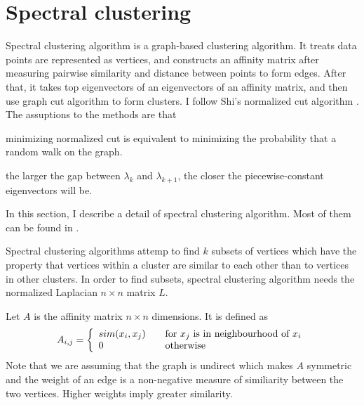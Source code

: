 \section{Spectral clustering}
Spectral clustering algorithm is a graph-based clustering algorithm. 
It treats data points are represented as vertices, and constructs an affinity matrix after measuring pairwise similarity and distance between points to form edges. 
After that, it takes top eigenvectors of an eigenvectors of an affinity matrix, and then use graph cut algorithm to form clusters. 
I follow Shi's normalized cut algorithm \cite{jianbo03}. 
The assuptions to the methods are that \begin{inparaenum}[\itshape a\upshape)]
\item minimizing normalized cut is equivalent to minimizing the probability that a random walk on the graph.
\item the larger the gap between $\lambda_{k}$ and $\lambda_{k+1}$, the closer the piecewise-constant eigenvectors will be.
\end{inparaenum}
In this section, I describe a detail of spectral clustering algorithm. 
Most of them can be found in \cite{ulrike07}. 

Spectral clustering algorithms attemp to find $k$ subsets of vertices which have the property that vertices within a cluster are similar to each other than to vertices in other clusters. 
In order to find subsets, spectral clustering algorithm needs the normalized Laplacian $n \times n$ matrix $L$. 

Let $A$ is the affinity matrix $n \times n$ dimensions. It is defined as 
\begin{equation}
A_{i,j} = \left\{ 
  \begin{array}{l l}
    sim(x_i, x_j) & \quad \text{for $x_j$ is in neighbourhood of $x_i$}\\
    0 & \quad \text{otherwise}
  \end{array} \right.
\end{equation}
Note that we are assuming that the graph is undirect which makes $A$ symmetric and the weight of an edge is a non-negative measure of similiarity between the two vertices. 
Higher weights imply greater similarity. 

